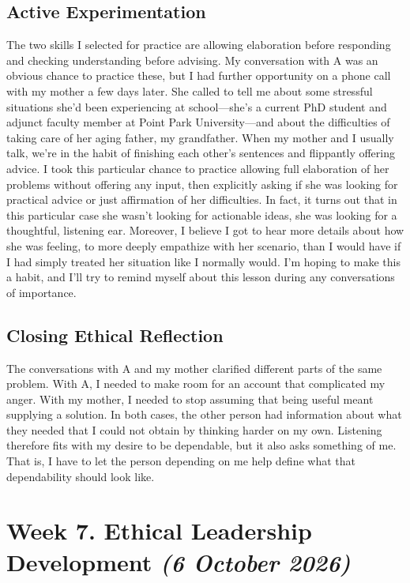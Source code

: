 \documentclass[12pt,stu,biblatex]{apa7}
\begin{document}
\subsection{Active Experimentation}
The two skills I selected for practice are allowing elaboration before responding and checking understanding before advising.
My conversation with A was an obvious chance to practice these, but I had further opportunity on a phone call with my mother a few days later.
She called to tell me about some stressful situations she'd been experiencing at school---she's a current PhD student and adjunct faculty member at Point Park University---and about the difficulties of taking care of her aging father, my grandfather.
When my mother and I usually talk, we're in the habit of finishing each other's sentences and flippantly offering advice.
I took this particular chance to practice allowing full elaboration of her problems without offering any input, then explicitly asking if she was looking for practical advice or just affirmation of her difficulties.
In fact, it turns out that in this particular case she wasn't looking for actionable ideas, she was looking for a thoughtful, listening ear.
Moreover, I believe I got to hear more details about how she was feeling, to more deeply empathize with her scenario, than I would have if I had simply treated her situation like I normally would.
I'm hoping to make this a habit, and I'll try to remind myself about this lesson during any conversations of importance.

\subsection{Closing Ethical Reflection}
The conversations with A and my mother clarified different parts of the same problem.
With A, I needed to make room for an account that complicated my anger.
With my mother, I needed to stop assuming that being useful meant supplying a solution.
In both cases, the other person had information about what they needed that I could not obtain by thinking harder on my own.
Listening therefore fits with my desire to be dependable, but it also asks something of me.
That is, I have to let the person depending on me help define what that dependability should look like.

\section{Week 7. Ethical Leadership Development \textit{(6 October 2026)}}
\end{document}
